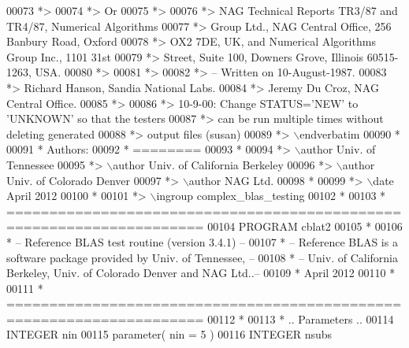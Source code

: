 \begin{DoxyCode}
00073 \textcolor{comment}{*>}
00074 \textcolor{comment}{*>       Or}
00075 \textcolor{comment}{*>}
00076 \textcolor{comment}{*>       NAG  Technical Reports TR3/87 and TR4/87,  Numerical Algorithms}
00077 \textcolor{comment}{*>       Group  Ltd.,  NAG  Central  Office,  256  Banbury  Road, Oxford}
00078 \textcolor{comment}{*>       OX2 7DE, UK,  and  Numerical Algorithms Group Inc.,  1101  31st}
00079 \textcolor{comment}{*>       Street,  Suite 100,  Downers Grove,  Illinois 60515-1263,  USA.}
00080 \textcolor{comment}{*>}
00081 \textcolor{comment}{*>}
00082 \textcolor{comment}{*> -- Written on 10-August-1987.}
00083 \textcolor{comment}{*>    Richard Hanson, Sandia National Labs.}
00084 \textcolor{comment}{*>    Jeremy Du Croz, NAG Central Office.}
00085 \textcolor{comment}{*>}
00086 \textcolor{comment}{*>    10-9-00:  Change STATUS='NEW' to 'UNKNOWN' so that the testers}
00087 \textcolor{comment}{*>              can be run multiple times without deleting generated}
00088 \textcolor{comment}{*>              output files (susan)}
00089 \textcolor{comment}{*> \(\backslash\)endverbatim}
00090 \textcolor{comment}{*}
00091 \textcolor{comment}{*  Authors:}
00092 \textcolor{comment}{*  ========}
00093 \textcolor{comment}{*}
00094 \textcolor{comment}{*> \(\backslash\)author Univ. of Tennessee }
00095 \textcolor{comment}{*> \(\backslash\)author Univ. of California Berkeley }
00096 \textcolor{comment}{*> \(\backslash\)author Univ. of Colorado Denver }
00097 \textcolor{comment}{*> \(\backslash\)author NAG Ltd. }
00098 \textcolor{comment}{*}
00099 \textcolor{comment}{*> \(\backslash\)date April 2012}
00100 \textcolor{comment}{*}
00101 \textcolor{comment}{*> \(\backslash\)ingroup complex\_blas\_testing}
00102 \textcolor{comment}{*}
00103 \textcolor{comment}{*  =====================================================================}
00104       \textcolor{keyword}{PROGRAM} cblat2
00105 \textcolor{comment}{*}
00106 \textcolor{comment}{*  -- Reference BLAS test routine (version 3.4.1) --}
00107 \textcolor{comment}{*  -- Reference BLAS is a software package provided by Univ. of Tennessee,    --}
00108 \textcolor{comment}{*  -- Univ. of California Berkeley, Univ. of Colorado Denver and NAG Ltd..--}
00109 \textcolor{comment}{*     April 2012}
00110 \textcolor{comment}{*}
00111 \textcolor{comment}{*  =====================================================================}
00112 \textcolor{comment}{*}
00113 \textcolor{comment}{*     .. Parameters ..}
00114       \textcolor{keywordtype}{INTEGER}            nin
00115       parameter( nin = 5 )
00116       \textcolor{keywordtype}{INTEGER}            nsubs

\end{DoxyCode}
